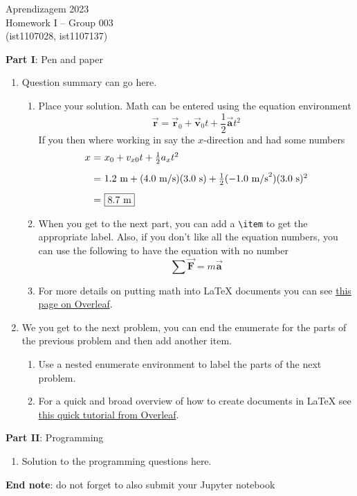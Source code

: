\documentclass[12pt]{article}
\begin{document}
\center
Aprendizagem 2023\\
Homework I -- Group 003\\
(ist1107028, ist1107137)\vskip 1cm

\large{\textbf{Part I}: Pen and paper}\normalsize

\begin{enumerate}[leftmargin=\labelsep]
\item Question summary can go here.
    \begin{enumerate}
    \item Place your solution. Math can be entered using the equation
    environment 
    \begin{equation}
        \vec{\mathbf{r}} = \vec{\mathbf{r}}_{0} + \vec{\mathbf{v}}_{0}t + \frac{1}{2}\vec{\mathbf{a}}t^{2}
    \end{equation}
    If you then where working in say the $x$-direction and had some numbers %
    \begin{equation}
    \begin{array}{r@{~=~}l}
    x & x_{0} + v_{x0}t + \frac{1}{2}a_{x}t^{2} \\ [2ex]
    & 1.2~\text{m} + (4.0~\text{m/s})(3.0~\text{s}) + \frac{1}{2}(-1.0~\text{m/s}^{2})(3.0~\text{s})^{2}\\ [2ex]
    & \boxed{8.7~\text{m}}
    \end{array}
    \end{equation}

    \item When you get to the next part, you can add a \verb"\item" to get the appropriate label. Also,
    if you don't like all the equation numbers, you can use the following to have the equation with
    no number
    \begin{equation*}
    \sum\vec{\mathbf{F}} = m\vec{\mathbf{a}}
    \end{equation*}

    \item For more details on putting math into {\LaTeX} documents you can see 
    \href{https://www.overleaf.com/learn/latex/Mathematical_expressions}{this page on Overleaf}.
    \end{enumerate}

\item We you get to the next problem, you can end the enumerate for the parts of the previous problem and then add another item.
    \begin{enumerate}
    \item Use a nested enumerate environment to label the parts of the next problem.
    \item For a quick and broad overview of how to create documents in {\LaTeX} see 
    \href{https://www.overleaf.com/learn/latex/Learn_LaTeX_in_30_minutes}{this quick tutorial from Overleaf}.
    \end{enumerate}
\end{enumerate}

\large{\textbf{Part II}: Programming}\normalsize

\begin{enumerate}[leftmargin=\labelsep,resume]
\item Solution to the programming questions here.
\end{enumerate}

\vskip 1cm
\textbf{End note}: do not forget to also submit your Jupyter notebook
\end{document}
